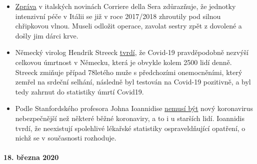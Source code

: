 \begin{itemize}
\tightlist
\item
  \href{https://milano.corriere.it/notizie/cronaca/18_gennaio_10/milano-terapie-intensive-collasso-l-influenza-gia-48-malati-gravi-molte-operazioni-rinviate-c9dc43a6-f5d1-11e7-9b06-fe054c3be5b2.shtml}{Zpráva}
  v italských novinách Corriere della Sera zdůrazňuje, že jednotky
  intenzivní péče v Itálii se již v roce 2017/2018 zhroutily pod silnou
  chřipkovou vlnou. Museli odložit operace, zavolat sestry zpět z
  dovolené a došly jim dárci krve.
\item
  Německý virolog Hendrik Streeck
  \href{https://www.faz.net/aktuell/gesellschaft/gesundheit/coronavirus/virologe-hendrik-streeck-ueber-corona-neue-symptome-entdeckt-16681450.html?printPagedArticle=true\#pageIndex_2}{tvrdí},
  že Covid-19 pravděpodobně nezvýší celkovou úmrtnost v Německu, která
  je obvykle kolem 2500 lidí denně. Streeck zmiňuje případ 78letého muže
  s předchozími onemocněními, který zemřel na srdeční selhání, následně
  byl testován na Covid-19 pozitivně, a byl tedy zahrnut do statistiky
  úmrtí Covid19.
\item
  Podle Stanfordského profesora Johna Ioannidise
  \href{https://www.statnews.com/2020/03/17/a-fiasco-in-the-making-as-the-coronavirus-pandemic-takes-hold-we-are-making-decisions-without-reliable-data/}{nemusí
  být} nový koronavirus nebezpečnější než některé běžné koronaviry, a to
  i u starších lidí. Ioannidis tvrdí, že neexistují spolehlivé lékařské
  statistiky ospraveldňující opatření, o nichž se v současnosti
  rozhoduje.\\
\end{itemize}

\hypertarget{18-bux159ezna-2020}{%
\paragraph{18. března 2020}\label{18-bux159ezna-2020}}

